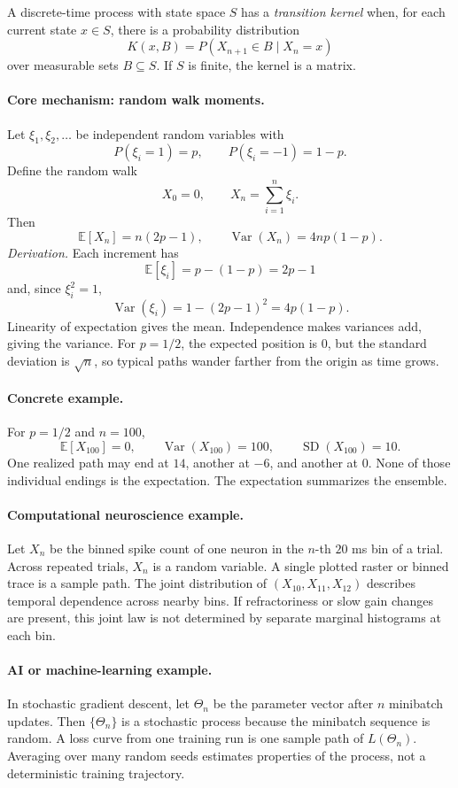 A discrete-time process with state space \(S\) has a \emph{transition kernel} when, for each current state \(x\in S\), there is a probability distribution
\[
K(x,B)=P(X_{n+1}\in B\mid X_n=x)
\]
over measurable sets \(B\subseteq S\). If \(S\) is finite, the kernel is a matrix.

\paragraph{Core mechanism: random walk moments.}
Let \(\xi_1,\xi_2,\ldots\) be independent random variables with
\[
P(\xi_i=1)=p,\qquad P(\xi_i=-1)=1-p.
\]
Define the random walk
\[
X_0=0,\qquad X_n=\sum_{i=1}^n \xi_i.
\]
Then
\[
\mathbb E[X_n]=n(2p-1),
\qquad
\operatorname{Var}(X_n)=4np(1-p).
\]
\emph{Derivation.} Each increment has
\[
\mathbb E[\xi_i]=p-(1-p)=2p-1
\]
and, since \(\xi_i^2=1\),
\[
\operatorname{Var}(\xi_i)=1-(2p-1)^2=4p(1-p).
\]
Linearity of expectation gives the mean. Independence makes variances add, giving the variance. For \(p=1/2\), the expected position is \(0\), but the standard deviation is \(\sqrt n\), so typical paths wander farther from the origin as time grows.

\paragraph{Concrete example.}
For \(p=1/2\) and \(n=100\),
\[
\mathbb E[X_{100}]=0,\qquad \operatorname{Var}(X_{100})=100,\qquad \operatorname{SD}(X_{100})=10.
\]
One realized path may end at \(14\), another at \(-6\), and another at \(0\). None of those individual endings is the expectation. The expectation summarizes the ensemble.

\paragraph{Computational neuroscience example.}
Let \(X_n\) be the binned spike count of one neuron in the \(n\)-th \(20\) ms bin of a trial. Across repeated trials, \(X_n\) is a random variable. A single plotted raster or binned trace is a sample path. The joint distribution of \((X_{10},X_{11},X_{12})\) describes temporal dependence across nearby bins. If refractoriness or slow gain changes are present, this joint law is not determined by separate marginal histograms at each bin.

\paragraph{AI or machine-learning example.}
In stochastic gradient descent, let \(\Theta_n\) be the parameter vector after \(n\) minibatch updates. Then \(\{\Theta_n\}\) is a stochastic process because the minibatch sequence is random. A loss curve from one training run is one sample path of \(L(\Theta_n)\). Averaging over many random seeds estimates properties of the process, not a deterministic training trajectory.

